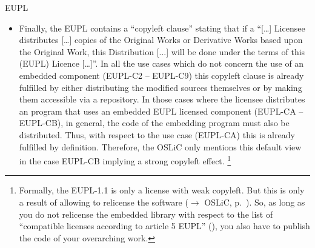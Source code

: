 \begin{license}{EUPL}
\begin{itemize}
\item Finally, the EUPL contains a \enquote{copyleft clause} stating that if a
  \enquote{[\ldots] Licensee distributes [\ldots] copies of the Original Works
  or Derivative Works based upon the Original Work, this Distribution [...] will
  be done under the terms of this (EUPL) Licence [\ldots]}. In all the use cases
  which do not concern the use of an embedded component (EUPL-C2 -- EUPL-C9) this
  copyleft clause is already fulfilled by either distributing the modified
  sources themselves or by making them accessible via a repository. In those
  cases where the licensee distributes an program that uses an embedded EUPL
  licensed component (EUPL-CA -- EUPL-CB), in general, the code of the embedding
  program must also be distributed. Thus, with respect to the use case (EUPL-CA)
  this is already fulfilled by definition. Therefore, the OSLiC only mentions
  this default view in the case EUPL-CB implying a strong copyleft effect.%
  \footnote{Formally, the EUPL-1.1 is only a license with weak copyleft. 
    But this is only a result of allowing to relicense the software
    ($\rightarrow$ OSLiC, p.\ ). So, as long as
    you do not relicense the embedded library with respect to the list of
    \enquote{compatible licenses according to article 5 EUPL} 
    (\cite[cf.][\nopage wp §5 and Appendix]{EuplLicense2007en}), 
    you also have to publish the code of your overarching work.}

\end{itemize}

\end{license}

%

